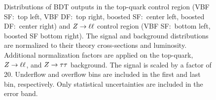 \begin{figure}[htb]
\begin{subfigure}[t]{0.45\textwidth}
    \end{subfigure}
    \caption{Distributions of BDT outputs in the top-quark control region (VBF SF:\ top left, VBF DF:\ top right, boosted SF:\ center left, boosted DF:\ center right)
             and $Z \to \ell \ell$ control region (VBF SF:\ bottom left, boosted SF\: bottom right).
             The signal and background distributions are normalized to their theory cross-sections and luminosity.
             Additional normalization factors are applied on the top-quark, $Z \to \ell \ell$, and $Z \to \tau \tau$ background.
             The signal is scaled by a factor of 20.
             Underflow and overflow bins are included in the first and last bin, respectively.
             Only statistical uncertainties are included in the error band.}\label{fig:mva:modeling:cr:bdts}
\end{figure}

